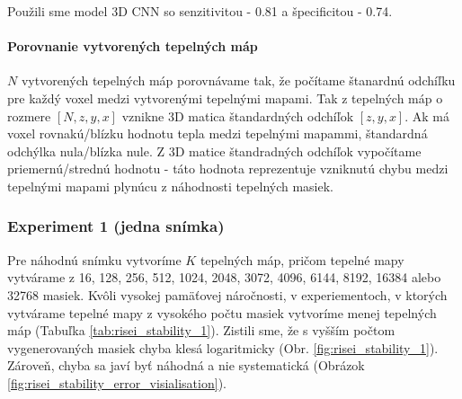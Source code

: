 Použili sme model 3D CNN so senzitivitou - 0.81 a špecificitou - 0.74.

\paragraph{Porovnanie vytvorených tepelných máp}

$N$ vytvorených tepelných máp porovnávame tak, že počítame štanardnú odchíľku pre každý voxel medzi vytvorenými tepelnými mapami. Tak z tepelných máp o rozmere $[N, z, y, x]$ vznikne 3D matica štandardných odchíľok $[z, y, x]$. Ak má voxel rovnakú/blízku hodnotu tepla medzi tepelnými mapammi, štandardná odchýlka nula/blízka nule. Z 3D matice štandradných odchíľok vypočítame priemernú/strednú hodnotu - táto hodnota reprezentuje vzniknutú chybu medzi tepelnými mapami plynúcu z náhodnosti tepelných masiek.

\subsubsection{Experiment 1 (jedna snímka) \label{sec:risei_stability_1}}

Pre náhodnú snímku vytvoríme $K$ tepelných máp, pričom tepelné mapy vytvárame z 16, 128, 256, 512, 1024, 2048, 3072, 4096, 6144, 8192, 16384 alebo 32768 masiek. Kvôli vysokej pamäťovej náročnosti, v experiementoch, v ktorých vytvárame tepelné mapy z vysokého počtu masiek vytvoríme menej tepelných máp (Tabuľka \ref{tab:risei_stability_1}). Zistili sme, že s vyšším počtom vygenerovaných masiek chyba klesá logaritmicky (Obr. \ref{fig:risei_stability_1}). Zároveň, chyba sa javí byť náhodná a nie systematická (Obrázok \ref{fig:risei_stability_error_visialisation}).

